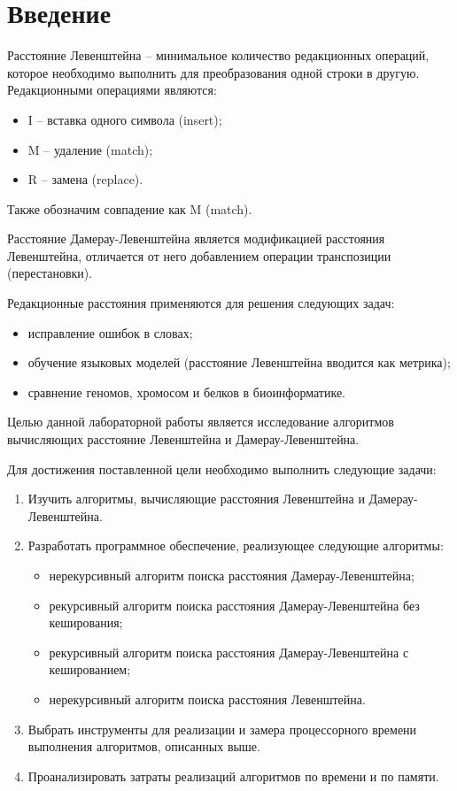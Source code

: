 \chapter*{Введение}

Расстояние Левенштейна -- минимальное количество редакционных операций, которое необходимо выполнить для преобразования одной строки в другую. Редакционными операциями являются: 
\begin{itemize}
	\item I -- вставка одного символа (insert);
	\item M -- удаление (match);
	\item R -- замена (replace).
\end{itemize}
Также обозначим совпадение как M (match).

Расстояние Дамерау-Левенштейна является модификацией расстояния Левенштейна, отличается от него добавлением операции транспозиции (перестановки).  

Редакционные расстояния применяются для решения следующих задач:
\begin{itemize}
	\item исправление ошибок в словах;
	\item обучение языковых моделей (расстояние Левенштейна вводится как метрика);
	\item сравнение геномов, хромосом и белков в биоинформатике.
\end{itemize}

Целью данной лабораторной работы является исследование алгоритмов вычисляющих расстояние Левенштейна и Дамерау-Левенштейна.

Для достижения поставленной цели необходимо выполнить следующие задачи:
\begin{enumerate}
	\item Изучить алгоритмы, вычисляющие расстояния Левенштейна и Дамерау-Левенштейна.
	\item Разработать программное обеспечение, реализующее следующие алгоритмы:
	\begin{itemize}
		\item нерекурсивный алгоритм поиска расстояния Дамерау-Левенштейна;
		\item рекурсивный алгоритм поиска расстояния Дамерау-Левенштейна без кеширования;
		\item рекурсивный алгоритм поиска расстояния Дамерау-Левенштейна с кешированием;
		\item нерекурсивный алгоритм поиска расстояния Левенштейна.
	\end{itemize}
	\item Выбрать инструменты для реализации и замера процессорного времени выполнения алгоритмов, описанных выше.
	\item Проанализировать затраты реализаций алгоритмов по времени и по памяти.
\end{enumerate}
